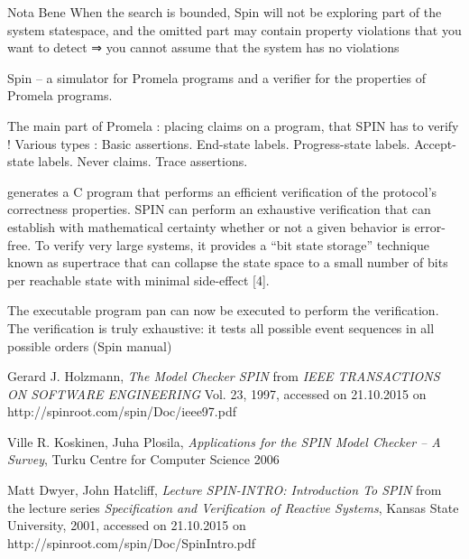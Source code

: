 \documentclass{report}
\begin{document}
Nota Bene
When the search is bounded, Spin will not be exploring part of the system
statespace, and the omitted part may contain property violations that you
want to detect ⇒ you cannot assume that the system has no violations

Spin -- a simulator for Promela programs and a verifier for the properties of Promela programs.

The main part of Promela : placing claims on a program, that SPIN has
to verify !
Various types :
Basic assertions.
End-state labels.
Progress-state labels.
Accept-state labels.
Never claims.
Trace assertions.


 generates a C
program that performs an efficient verification of the protocol’s correctness properties.
 SPIN can perform an exhaustive
verification that can establish with mathematical certainty whether or not a given behavior
is error-free. To verify very large systems, it provides a “bit state storage” technique
known as supertrace that can collapse the state space to a small number of bits per
reachable state with minimal side-effect [4]. 

The executable program pan can now be executed to perform the verification. The verification is truly exhaustive: it tests all possible event sequences in all possible orders (Spin manual)

\begin{thebibliography}{9}

  Gerard J. Holzmann,
  \emph{The Model Checker SPIN} from \emph{IEEE TRANSACTIONS ON SOFTWARE ENGINEERING} Vol. 23,
  1997, accessed on 21.10.2015 on http://spinroot.com/spin/Doc/ieee97.pdf
  
  Ville R. Koskinen, Juha Plosila,
  \emph{Applications for the SPIN Model
Checker – A Survey}, Turku Centre for Computer Science
  2006
  
   Matt Dwyer, John Hatcliff,
  \emph{Lecture SPIN-INTRO:
Introduction To SPIN} from the lecture series \emph{Specification and Verification of Reactive Systems}, Kansas State University,
  2001,  accessed on 21.10.2015 on http://spinroot.com/spin/Doc/SpinIntro.pdf

\end{thebibliography}
\end{document}

